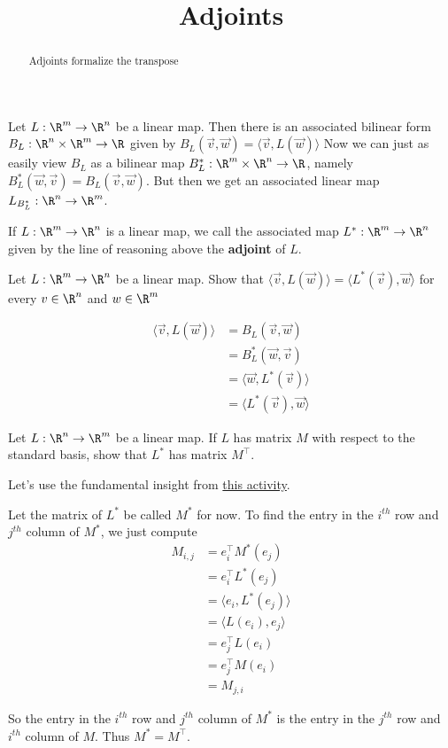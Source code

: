 \documentclass{ximera}
\title{Adjoints}
\begin{document}
	\begin{abstract}
		Adjoints formalize the transpose
	\end{abstract}
	
		Let $L: \R^m \to \R^n$ be a linear map.  
		Then there is an associated bilinear form $B_L  : \R^n \times \R^m \to \R$ given by $B_L(\vec{v},\vec{w}) = \langle \vec{v}, L(\vec{w}) \rangle$
		Now we can just as easily view $B_L$ as a bilinear map  $B_L^*: \R^m \times \R^n \to \R$, namely $B_L^* (\vec{w},\vec{v}) = B_L(\vec{v},\vec{w})$.
		But then we get an associated linear map $L_{B_L^*} : \R^n \to \R^m$.
		
		\begin{definition}
			If $L:\R^m \to \R^n$ is a linear map, we call the associated map $L^* : \R^m \to \R^n$ given by the line of reasoning above the \textbf{adjoint} of $L$.
		\end{definition}
		
			Let $L: \R^m \to \R^n$ be a linear map.  
			Show that $\langle \vec{v}, L(\vec{w})\rangle = \langle  L^*(\vec{v}),\vec{w}\rangle$ for every $v \in \R^n$ and $w \in \R^m$
			\begin{free-response}
				\begin{align*}
					\langle \vec{v}, L(\vec{w})\rangle &= B_L(\vec{v},\vec{w})\\
						&= B_L^*(\vec{w},\vec{v})\\
						&=\langle \vec{w},L^*(\vec{v}) \rangle\\
						&=\langle L^*(\vec{v}), \vec{w}\rangle
				\end{align*}
			\end{free-response}
	
			Let $L: \R^n \to \R^m$ be a linear map.
			If $L$ has matrix $M$ with respect to the standard basis, show that $L^*$ has matrix $M^\top$.
\begin{free-response}
	Let's use the fundamental insight from \href{http://ximera.osu.edu/course/kisonecat/m2o2c2/course/activity/week1/inner-product/multiply-dot/}{this activity}.  
	
	Let the matrix of $L^*$ be called $M^*$ for now.
	To find the entry in the $i^{th}$ row and $j^{th}$ column of $M^*$, we just  compute 
	\begin{align*}
		M_{i,j} &= e_i^\top M^*(e_j)\\
			&=e_i^\top L^*(e_j)\\
			&= \langle e_i , L^*(e_j)\rangle\\
			&= \langle  L(e_i), e_j \rangle\\
			&=e_j^\top L(e_i)\\
			&=e_j^\top M(e_i)\\
			&= M_{j,i}
	\end{align*}
	
	So the entry  in the $i^{th}$ row and $j^{th}$ column of $M^*$ is the entry in the $j^{th}$ row and $i^{th}$ column of $M$.  Thus $M^* = M^\top$.
\end{free-response}
\end{document}
